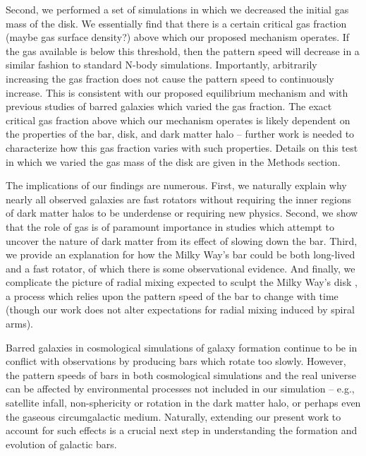 \documentclass{natureprintstyle}
\begin{document}
Second, we performed a set of simulations in which we decreased the initial
gas mass of the disk. We essentially find that there is a certain critical gas
fraction (maybe gas surface density?) above which our proposed mechanism
operates. If the gas available is below this threshold, then the pattern speed
will decrease in a similar fashion to standard N-body simulations.
Importantly, arbitrarily increasing the gas fraction does not cause the
pattern speed to continuously increase. This is consistent with our proposed
equilibrium mechanism and with previous studies of barred galaxies which
varied the gas fraction.\cite{2010ApJ...719.1470V} The exact critical gas
fraction above which our mechanism operates is likely dependent on the
properties of the bar, disk, and dark matter halo -- further work is needed to
characterize how this gas fraction varies with such properties. Details on
this test in which we varied the gas mass of the disk are given in the Methods
section.

The implications of our findings are numerous. First, we naturally explain why
nearly all observed galaxies are fast rotators without requiring the inner
regions of dark matter halos to be underdense\cite{1998ApJ...493L...5D,
2000ApJ...543..704D} or requiring new physics.\cite{2021MNRAS.503.2833R,
2021MNRAS.508..926R} Second, we show that the role of gas is of paramount
importance in studies which attempt to uncover the nature of dark matter from
its effect of slowing down the bar.\cite{2021MNRAS.500.4710C,
2021MNRAS.505.2412C} Third, we provide an explanation for how the Milky Way's
bar could be both long-lived and a fast rotator, of which there is some
observational evidence.\cite{2019MNRAS.490.4740B} And finally, we complicate
the picture of radial mixing expected to sculpt the Milky Way's disk
\cite{2012MNRAS.420..913B, 2015ApJ...808..132H}, a process which relies upon
the pattern speed of the bar to change with time (though our work does not
alter expectations for radial mixing induced by spiral
arms\cite{2002MNRAS.336..785S}).

Barred galaxies in cosmological simulations of galaxy formation continue to be
in conflict with observations by producing bars which rotate too
slowly.\cite{2017MNRAS.469.1054A, 2019MNRAS.483.2721P, 2021AA...650L..16F}
However, the pattern speeds of bars in both cosmological simulations and the
real universe can be affected by environmental processes not included in our
simulation -- e.g., satellite infall\cite{2011Natur.477..301P},
non-sphericity\cite{2013MNRAS.429.1949A} or rotation\cite{2013MNRAS.434.1287S,
2014ApJ...783L..18L, 2018MNRAS.476.1331C, 2019MNRAS.488.5788C} in the dark
matter halo, or perhaps even the gaseous circumgalactic medium. Naturally,
extending our present work to account for such effects is a crucial next step
in understanding the formation and evolution of galactic bars.
\end{document}
